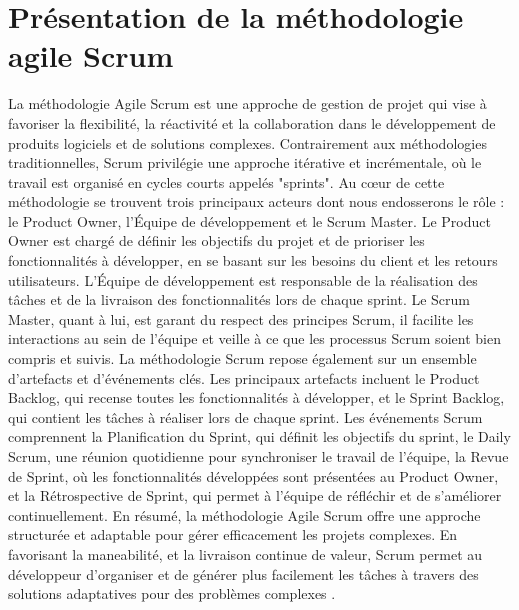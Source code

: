 \section{Présentation de la méthodologie agile Scrum}
La méthodologie Agile Scrum est une approche de gestion de projet qui vise à favoriser la flexibilité, la réactivité et la collaboration dans le développement de produits logiciels et de solutions complexes. Contrairement aux méthodologies traditionnelles, Scrum privilégie une approche itérative et incrémentale, où le travail est organisé en cycles courts appelés "sprints"\cite{permana2015scrum}.
	Au cœur de cette méthodologie se trouvent trois principaux acteurs dont nous endosserons le rôle : le Product Owner, l'Équipe de développement et le Scrum Master. Le Product Owner est chargé de définir les objectifs du projet et de prioriser les fonctionnalités à développer, en se basant sur les besoins du client et les retours utilisateurs. L'Équipe de développement est responsable de la réalisation des tâches et de la livraison des fonctionnalités lors de chaque sprint. Le Scrum Master, quant à lui, est garant du respect des principes Scrum, il facilite les interactions au sein de l'équipe et veille à ce que les processus Scrum soient bien compris et suivis.
La méthodologie Scrum repose également sur un ensemble d'artefacts et d'événements clés. Les principaux artefacts incluent le Product Backlog, qui recense toutes les fonctionnalités à développer, et le Sprint Backlog, qui contient les tâches à réaliser lors de chaque sprint. Les événements Scrum comprennent la Planification du Sprint, qui définit les objectifs du sprint, le Daily Scrum, une réunion quotidienne pour synchroniser le travail de l'équipe, la Revue de Sprint, où les fonctionnalités développées sont présentées au Product Owner, et la Rétrospective de Sprint, qui permet à l'équipe de réfléchir et de s'améliorer continuellement.
En résumé, la méthodologie Agile Scrum offre une approche structurée et adaptable pour gérer efficacement les projets complexes. En favorisant la maneabilité, et la livraison continue de valeur, Scrum permet au développeur d'organiser et de générer plus facilement les tâches à travers des solutions adaptatives pour des problèmes complexes \cite{schwaber2011scrum}.
	
